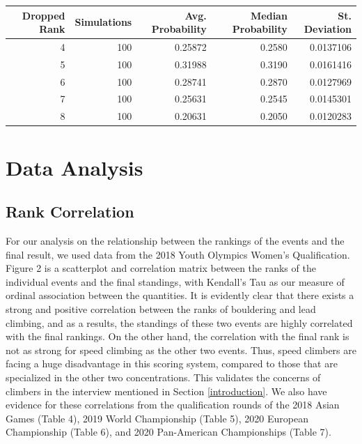 \documentclass[12pt]{article}
\begin{document}
\begin{tabular}{r|r|r|r|r}
\hline
Dropped Rank & Simulations & Avg. Probability & Median Probability & St. Deviation\\
\hline
4 & 100 & 0.25872 & 0.2580 & 0.0137106\\
\hline
5 & 100 & 0.31988 & 0.3190 & 0.0161416\\
\hline
6 & 100 & 0.28741 & 0.2870 & 0.0127969\\
\hline
7 & 100 & 0.25631 & 0.2545 & 0.0145301\\
\hline
8 & 100 & 0.20631 & 0.2050 & 0.0120283\\
\hline
\end{tabular}

\hypertarget{data-analysis}{%
\section{Data Analysis}\label{data-analysis}}

\hypertarget{rank-correlation}{%
\subsection{Rank Correlation}\label{rank-correlation}}

For our analysis on the relationship between the rankings of the events
and the final result, we used data from the 2018 Youth Olympics Women's
Qualification. Figure 2 is a scatterplot and correlation matrix between
the ranks of the individual events and the final standings, with
Kendall's Tau \citep{kendall1938} as our measure of ordinal association
between the quantities. It is evidently clear that there exists a strong
and positive correlation between the ranks of bouldering and lead
climbing, and as a results, the standings of these two events are highly
correlated with the final rankings. On the other hand, the correlation
with the final rank is not as strong for speed climbing as the other two
events. Thus, speed climbers are facing a huge disadvantage in this
scoring system, compared to those that are specialized in the other two
concentrations. This validates the concerns of climbers in the interview
mentioned in Section \ref{introduction}. We also have evidence for these
correlations from the qualification rounds of the 2018 Asian Games
(Table 4), 2019 World Championship (Table 5), 2020 European Championship
(Table 6), and 2020 Pan-American Championships (Table 7).
\end{document}
